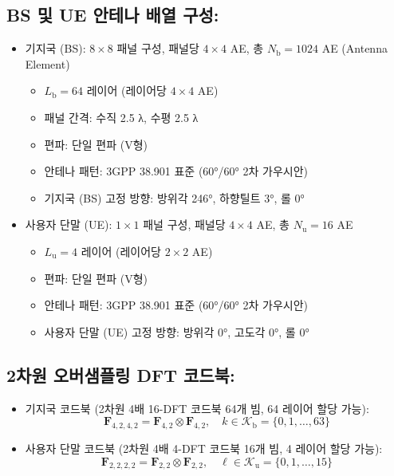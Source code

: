 \documentclass[10pt]{article}
\begin{document}
\subsection{BS 및 UE 안테나 배열 구성:}
\begin{itemize}
    \item {기지국 (BS)}: $8 \times 8$ 패널 구성, 패널당 $4 \times 4$ AE, 총 $N_{\text{b}} = 1024$ AE (Antenna Element)
    \begin{itemize}
        \item $L_{\text{b}} = 64$ 레이어 (레이어당 $4 \times 4$ AE)
        \item 패널 간격: 수직 2.5 λ, 수평 2.5 λ
        \item 편파: 단일 편파 (V형)
        \item 안테나 패턴: 3GPP 38.901 표준 (60°/60° 2차 가우시안)
        \item {기지국 (BS) 고정 방향}: 방위각 246°, 하향틸트 3°, 롤 0°
    \end{itemize}
    \item {사용자 단말 (UE)}: $1 \times 1$ 패널 구성, 패널당 $4 \times 4$ AE, 총 $N_{\text{u}} = 16$ AE
    \begin{itemize}
        \item $L_{\text{u}} = 4$ 레이어 (레이어당 $2 \times 2$ AE)
        \item 편파: 단일 편파 (V형)
        \item 안테나 패턴: 3GPP 38.901 표준 (60°/60° 2차 가우시안) 
        \item {사용자 단말 (UE) 고정 방향}: 방위각 0°, 고도각 0°, 롤 0°
    \end{itemize}
\end{itemize}

\subsection{2차원 오버샘플링 DFT 코드북:}
\begin{itemize}
    \item 기지국 코드북 (2차원 4배 16-DFT 코드북 64개 빔, 64 레이어 할당 가능): 
    $$\mathbf{F}_{4,2,4,2} = \mathbf{F}_{4,2} \otimes \mathbf{F}_{4,2}, \quad k \in \mathcal{K}_{\text{b}} = \{0, 1, \ldots, 63\}$$ 
    \item 사용자 단말 코드북 (2차원 4배 4-DFT 코드북 16개 빔, 4 레이어 할당 가능): 
    $$\mathbf{F}_{2,2,2,2} = \mathbf{F}_{2,2} \otimes \mathbf{F}_{2,2}, \quad \ell \in \mathcal{K}_{\text{u}} = \{0, 1, \ldots, 15\}$$
\end{itemize}
\end{document}
